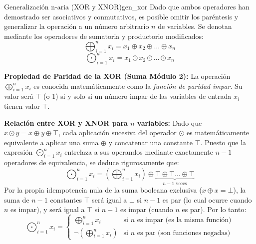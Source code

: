 \begin{teorema}{Generalización n-aria (XOR y XNOR)}{gen_xor}
Dado que ambos operadores han demostrado ser asociativos y conmutativos, es posible omitir los paréntesis y generalizar la operación a un número arbitrario $n$ de variables. Se denotan mediante los operadores de sumatoria y productorio modificados:
\[ \bigoplus_{i=1}^{n} x_i = x_1 \oplus x_2 \oplus \dots \oplus x_n \]
\[ \bigodot_{i=1}^{n} x_i = x_1 \odot x_2 \odot \dots \odot x_n \]

\textbf{Propiedad de Paridad de la XOR (Suma Módulo 2):}
La operación $\bigoplus_{i=1}^{n} x_i$ es conocida matemáticamente como la \textit{función de paridad impar}. Su valor será $\top$ (o 1) si y solo si un número impar de las variables de entrada $x_i$ tienen valor $\top$.

\textbf{Relación entre XOR y XNOR para $n$ variables:}
Dado que $x \odot y = x \oplus y \oplus \top$, cada aplicación sucesiva del operador $\odot$ es matemáticamente equivalente a aplicar una suma $\oplus$ y concatenar una constante $\top$. Puesto que la expresión $\bigodot_{i=1}^{n} x_i$ entrelaza a sus operandos mediante exactamente $n-1$ operadores de equivalencia, se deduce rigurosamente que:
\[ \bigodot_{i=1}^{n} x_i = \left( \bigoplus_{i=1}^{n} x_i \right) \oplus \underbrace{\top \oplus \top \dots \oplus \top}_{n-1 \text{ veces}} \]
Por la propia idempotencia nula de la suma booleana exclusiva ($x \oplus x = \bot$), la suma de $n-1$ constantes $\top$ será igual a $\bot$ si $n-1$ es par (lo cual ocurre cuando $n$ es impar), y será igual a $\top$ si $n-1$ es impar (cuando $n$ es par). Por lo tanto:
\[ 
\bigodot_{i=1}^{n} x_i = \begin{cases} 
\bigoplus_{i=1}^{n} x_i & \text{si } n \text{ es impar (es la misma función)} \\
\neg \left( \bigoplus_{i=1}^{n} x_i \right) & \text{si } n \text{ es par (son funciones negadas)}
\end{cases} 
\]
\end{teorema}

